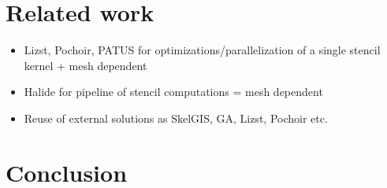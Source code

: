 \documentclass[twocolumn]{svjour3}          %
\begin{document}
\section{Related work}
\label{sect:rel}
\begin{itemize}
\item Lizst, Pochoir, PATUS for optimizations/parallelization of a single stencil kernel + mesh dependent
\item Halide for pipeline of stencil computations = mesh dependent
\item Reuse of external solutions as SkelGIS, GA, Lizst, Pochoir etc.
\end{itemize}
\section{Conclusion}
\label{sect:concl}




\end{document}
